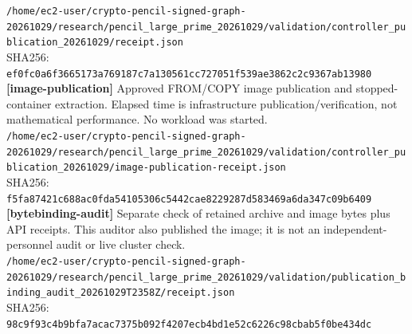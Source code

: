 \documentclass[11pt]{article}
\begin{document}
\texttt{/\allowbreak{}home/\allowbreak{}ec2-user/\allowbreak{}crypto-pencil-signed-graph-20261029/\allowbreak{}research/\allowbreak{}pencil\_large\_prime\_20261029/\allowbreak{}validation/\allowbreak{}controller\_publication\_20261029/\allowbreak{}receipt.json}\\
SHA256: \texttt{ef0fc0a6f3665173a769187c7a130561cc727051f539ae3862c2c9367ab13980}\\
\textbf{[image-publication]} Approved FROM/COPY image publication and stopped-container extraction. Elapsed time is infrastructure publication/verification, not mathematical performance. No workload was started.\\
\texttt{/\allowbreak{}home/\allowbreak{}ec2-user/\allowbreak{}crypto-pencil-signed-graph-20261029/\allowbreak{}research/\allowbreak{}pencil\_large\_prime\_20261029/\allowbreak{}validation/\allowbreak{}controller\_publication\_20261029/\allowbreak{}image-publication-receipt.json}\\
SHA256: \texttt{f5fa87421c688ac0fda54105306c5442cae8229287d583469a6da347c09b6409}\\
\textbf{[bytebinding-audit]} Separate check of retained archive and image bytes plus API receipts. This auditor also published the image; it is not an independent-personnel audit or live cluster check.\\
\texttt{/\allowbreak{}home/\allowbreak{}ec2-user/\allowbreak{}crypto-pencil-signed-graph-20261029/\allowbreak{}research/\allowbreak{}pencil\_large\_prime\_20261029/\allowbreak{}validation/\allowbreak{}publication\_binding\_audit\_20261029T2358Z/\allowbreak{}receipt.json}\\
SHA256: \texttt{98c9f93c4b9bfa7acac7375b092f4207ecb4bd1e52c6226c98cbab5f0be434dc}\\
\end{document}
